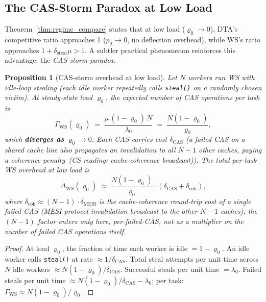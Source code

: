 \documentclass[11pt,a4paper]{article}
\newtheorem{proposition}[theorem]{Proposition}
\newcommand{\physics}[2]{#1\ \textnormal{(\emph{CS reading}: #2)}}
\begin{document}
\subsection{The CAS-Storm Paradox at Low Load}
\label{subsec:cas_storm}

Theorem~\ref{thm:regime_compare} states that at low load ($\varrho_0 \to 0$),
DTA's competitive ratio approaches 1 ($p_d \to 0$, no deflection overhead),
while WS's ratio approaches $1 + \delta_{\mathrm{steal}}\mu > 1$.
A subtler practical phenomenon reinforces this advantage: the
\emph{CAS-storm paradox}.

\begin{proposition}[CAS-storm overhead at low load]\label{prop:cas_storm}
Let $N$ workers run WS with idle-loop stealing (each idle worker repeatedly
calls \texttt{steal()} on a randomly chosen victim).
At steady-state load $\varrho_0$, the expected number of CAS operations
per task is
\begin{equation}\label{eq:cas_per_task}
  \Gamma_{\mathrm{WS}}(\varrho_0)
  \;=\;
  \frac{\mu\,(1-\varrho_0)\,N}{\lambda_0}
  \;=\;
  \frac{N(1-\varrho_0)}{\varrho_0},
\end{equation}
which \textbf{diverges as} $\varrho_0 \to 0$.  Each CAS carries cost
$\delta_{\mathrm{CAS}}$ (a failed CAS on a shared cache line also
propagates an invalidation to all $N-1$ other caches, paying a
\physics{coherence penalty}{cache-coherence broadcast}).
The total per-task WS overhead at low load is
\begin{equation}\label{eq:ws_low_load_overhead}
  \Delta_{\mathrm{WS}}(\varrho_0)
  \;\approx\;
  \frac{N(1-\varrho_0)}{\varrho_0} \cdot (\delta_{\mathrm{CAS}} + \delta_{\mathrm{coh}}),
\end{equation}
where $\delta_{\mathrm{coh}} \approx (N-1)\cdot\delta_{\mathrm{MESI}}$ is
the cache-coherence round-trip cost of a single failed CAS (MESI protocol
invalidation broadcast to the other $N-1$ caches); the $(N-1)$ factor
enters only here, per-failed-CAS, not as a multiplier on the number of
failed CAS operations itself.
\end{proposition}

\begin{proof}
At load $\varrho_0$, the fraction of time each worker is idle $= 1-\varrho_0$.
An idle worker calls \texttt{steal()} at rate $\approx 1/\delta_{\mathrm{CAS}}$.
Total steal attempts per unit time across $N$ idle workers $\approx N(1-\varrho_0)/\delta_{\mathrm{CAS}}$.
Successful steals per unit time $= \lambda_0$.
Failed steals per unit time $\approx N(1-\varrho_0)/\delta_{\mathrm{CAS}} - \lambda_0$;
per task: $\Gamma_{\mathrm{WS}} \approx N(1-\varrho_0)/\varrho_0$.
\end{proof}
\end{document}
